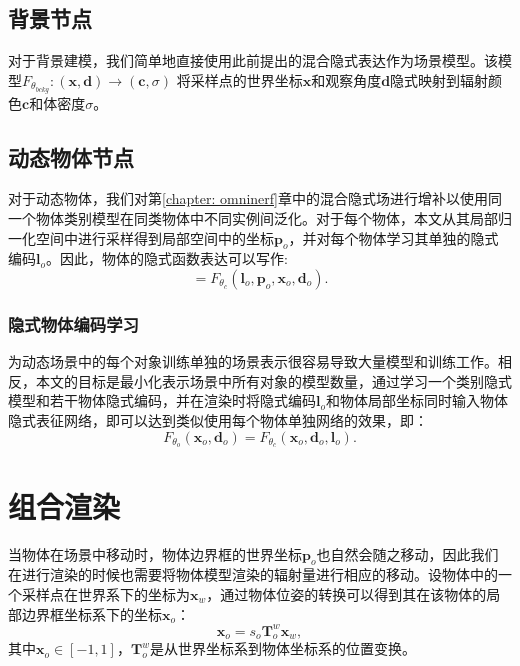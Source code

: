 \newcommand{\bgweight}{{\theta_{bckg}}}
\newcommand{\bgmodel}{F_{\bgweight}}
\newcommand{\classweight}{{\theta_{c}}}
\newcommand{\classmodel}{F_{\classweight}}
\newcommand{\xbf}{{\mathbf{x}}}
\newcommand{\dbf}{{\mathbf{d}}}
\newcommand{\cbf}{{\mathbf{c}}}
\newcommand{\po}{{\mathbf{p}_o}}
\newcommand{\latent}{{\mathbf{l}_o}}
\newcommand{\xo}{{\xbf_o}}
\newcommand{\dobj}{{\dbf_o}}
\newcommand{\xw}{{\xbf_w}}
\newcommand{\objpose}{\mathbf{T}_o^w}
\newcommand{\campose}{\mathbf{T}_c^w}
\newcommand{\ray}{{\mathbf{r}}}
\newcommand{\tobj}{{t_{o}}}
\newcommand{\tino}{{t_{o, in}}}
\newcommand{\touto}{{t_{o, out}}}
\newcommand{\tinw}{{t_{w, in}}}
\newcommand{\toutw}{{t_{w, out}}}

\subsection{背景节点}
对于背景建模，我们简单地直接使用此前提出的混合隐式表达作为场景模型。该模型$\bgmodel: (\xbf, \dbf) \to (\cbf, \sigma)$
将采样点的世界坐标$\xbf$和观察角度$\dbf$隐式映射到辐射颜色$\cbf$和体密度$\sigma$。

\subsection{动态物体节点}
对于动态物体，我们对第\ref{chapter: omninerf}章中的混合隐式场进行增补以使用同一个物体类别模型在同类物体中不同实例间泛化。对于每个物体，本文从其局部归一化空间中进行采样得到局部空间中的坐标$\po$，并对每个物体学习其单独的隐式编码$\latent$。因此，物体的隐式函数表达可以写作:
\begin{equation}
[\cbf(\xo), \sigma(\xo)] = \classmodel(\latent, \po, \xo, \dobj).
\end{equation}

\subsubsection{隐式物体编码学习}
为动态场景中的每个对象训练单独的场景表示很容易导致大量模型和训练工作。相反，本文的目标是最小化表示场景中所有对象的模型数量，通过学习一个类别隐式模型和若干物体隐式编码，并在渲染时将隐式编码$\latent$和物体局部坐标同时输入物体隐式表征网络，即可以达到类似使用每个物体单独网络的效果，即：
\begin{equation}
    F_{\theta_o}(\xo, \dobj) = \classmodel(\xo, \dobj, \latent).
\end{equation}

\section{组合渲染}
当物体在场景中移动时，物体边界框的世界坐标$\po$也自然会随之移动，因此我们在进行渲染的时候也需要将物体模型渲染的辐射量进行相应的移动。设物体中的一个采样点在世界系下的坐标为$\xw$，通过物体位姿的转换可以得到其在该物体的局部边界框坐标系下的坐标$\xo$：
\begin{equation}
    \xo = s_o\objpose\xw,
\end{equation}
其中$\xo\in[-1,1]$，$\objpose$是从世界坐标系到物体坐标系的位置变换。

